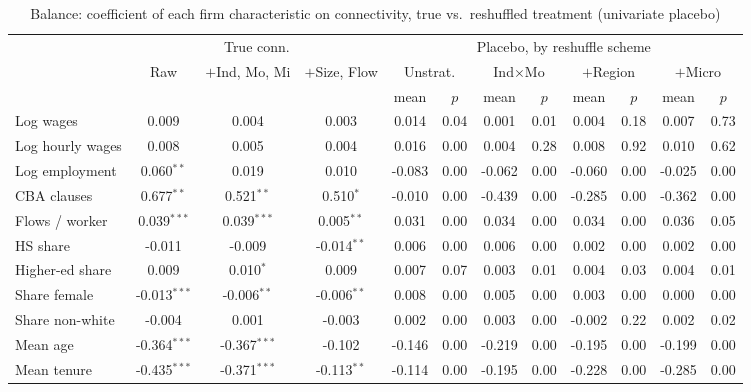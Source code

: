 \begin{table}[htbp]\centering
\caption{Balance: coefficient of each firm characteristic on connectivity, true vs.\ reshuffled treatment (univariate placebo)}
\label{tab:balance_permute_univ}
{\setlength{\tabcolsep}{3pt}\scriptsize
\begin{tabular}{l ccc cccccccc}
\toprule
 & \multicolumn{3}{c}{True conn.} & \multicolumn{8}{c}{Placebo, by reshuffle scheme} \\
\cmidrule(lr){2-4}\cmidrule(lr){5-12}
 & Raw & \shortstack{$+$Ind,\\Mo, Mi} & \shortstack{$+$Size,\\Flow} & \multicolumn{2}{c}{Unstrat.} & \multicolumn{2}{c}{Ind$\times$Mo} & \multicolumn{2}{c}{$+$Region} & \multicolumn{2}{c}{$+$Micro} \\
 & & & & mean & $p$ & mean & $p$ & mean & $p$ & mean & $p$ \\
\midrule
Log wages & 0.009 & 0.004 & 0.003 & 0.014 & 0.04 & 0.001 & 0.01 & 0.004 & 0.18 & 0.007 & 0.73 \\
Log hourly wages & 0.008 & 0.005 & 0.004 & 0.016 & 0.00 & 0.004 & 0.28 & 0.008 & 0.92 & 0.010 & 0.62 \\
Log employment & 0.060$^{**}$ & 0.019 & 0.010 & -0.083 & 0.00 & -0.062 & 0.00 & -0.060 & 0.00 & -0.025 & 0.00 \\
CBA clauses & 0.677$^{**}$ & 0.521$^{**}$ & 0.510$^{*}$ & -0.010 & 0.00 & -0.439 & 0.00 & -0.285 & 0.00 & -0.362 & 0.00 \\
Flows / worker & 0.039$^{***}$ & 0.039$^{***}$ & 0.005$^{**}$ & 0.031 & 0.00 & 0.034 & 0.00 & 0.034 & 0.00 & 0.036 & 0.05 \\
HS share & -0.011 & -0.009 & -0.014$^{**}$ & 0.006 & 0.00 & 0.006 & 0.00 & 0.002 & 0.00 & 0.002 & 0.00 \\
Higher-ed share & 0.009 & 0.010$^{*}$ & 0.009 & 0.007 & 0.07 & 0.003 & 0.01 & 0.004 & 0.03 & 0.004 & 0.01 \\
Share female & -0.013$^{***}$ & -0.006$^{**}$ & -0.006$^{**}$ & 0.008 & 0.00 & 0.005 & 0.00 & 0.003 & 0.00 & 0.000 & 0.00 \\
Share non-white & -0.004 & 0.001 & -0.003 & 0.002 & 0.00 & 0.003 & 0.00 & -0.002 & 0.22 & 0.002 & 0.02 \\
Mean age & -0.364$^{***}$ & -0.367$^{***}$ & -0.102 & -0.146 & 0.00 & -0.219 & 0.00 & -0.195 & 0.00 & -0.199 & 0.00 \\
Mean tenure & -0.435$^{***}$ & -0.371$^{***}$ & -0.113$^{**}$ & -0.114 & 0.00 & -0.195 & 0.00 & -0.228 & 0.00 & -0.285 & 0.00 \\

\end{tabular}}
\end{table}
